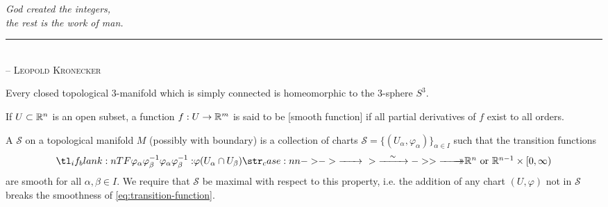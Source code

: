 
\begin{flushleft}
	\textsl{God created the integers,}\\
	\textsl{the rest is the work of man.}\\
	\rule[0pt]{13em}{0.5pt}\\
	-- \textsc{Leopold Kronecker}\\
	\vspace{2em}
\end{flushleft}


\begin{conjecture}
	Every closed topological $3$-manifold which is simply connected is homeomorphic to the $3$-sphere $S^3$.
\end{conjecture}

\begin{definition}
	If $U\subset \mathbb{R}^n$ is an open subset, a function $f : U \to \mathbb{R}^m$ is said to be [smooth function] if all partial derivatives of $f$ exist to all orders.
\end{definition}

\begin{definition}
	A  $\mathscr{S}$ on a topological manifold $M$ (possibly with boundary) is a collection of charts $\mathscr{S}=\{(U_\alpha, \varphi_\alpha)\}_{\alpha\in I}$ such that the transition functions
	\begin{equation}\label{eq:transition-function}
		\lkxfunc{\varphi_\alpha\varphi_\beta^{-1}}{\varphi(U_\alpha\cap U_\beta)}{\R^n\textrm{ or } \R^{n-1}\times [0,\infty)}
	\end{equation}
	are smooth for all $\alpha,\beta\in I$. We require that $\mathscr{S}$ be maximal with respect to this property, i.e. the addition of any chart $(U,\varphi)$ not in $\mathscr{S}$ breaks the smoothness of \cref{eq:transition-function}.
\end{definition}

